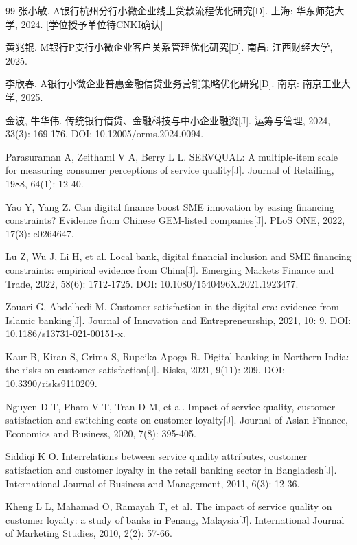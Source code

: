 \begin{thebibliography}{99}
 张小敏. A银行杭州分行小微企业线上贷款流程优化研究[D]. 上海: 华东师范大学, 2024. [学位授予单位待CNKI确认]

 黄兆锟. M银行P支行小微企业客户关系管理优化研究[D]. 南昌: 江西财经大学, 2025.

 李欣春. A银行小微企业普惠金融信贷业务营销策略优化研究[D]. 南京: 南京工业大学, 2025.

 金波, 牛华伟. 传统银行借贷、金融科技与中小企业融资[J]. 运筹与管理, 2024, 33(3): 169-176. DOI: 10.12005/orms.2024.0094.

 Parasuraman A, Zeithaml V A, Berry L L. SERVQUAL: A multiple-item scale for measuring consumer perceptions of service quality[J]. Journal of Retailing, 1988, 64(1): 12-40.

 Yao Y, Yang Z. Can digital finance boost SME innovation by easing financing constraints? Evidence from Chinese GEM-listed companies[J]. PLoS ONE, 2022, 17(3): e0264647.

 Lu Z, Wu J, Li H, et al. Local bank, digital financial inclusion and SME financing constraints: empirical evidence from China[J]. Emerging Markets Finance and Trade, 2022, 58(6): 1712-1725. DOI: 10.1080/1540496X.2021.1923477.

 Zouari G, Abdelhedi M. Customer satisfaction in the digital era: evidence from Islamic banking[J]. Journal of Innovation and Entrepreneurship, 2021, 10: 9. DOI: 10.1186/s13731-021-00151-x.

 Kaur B, Kiran S, Grima S, Rupeika-Apoga R. Digital banking in Northern India: the risks on customer satisfaction[J]. Risks, 2021, 9(11): 209. DOI: 10.3390/risks9110209.

 Nguyen D T, Pham V T, Tran D M, et al. Impact of service quality, customer satisfaction and switching costs on customer loyalty[J]. Journal of Asian Finance, Economics and Business, 2020, 7(8): 395-405.

 Siddiqi K O. Interrelations between service quality attributes, customer satisfaction and customer loyalty in the retail banking sector in Bangladesh[J]. International Journal of Business and Management, 2011, 6(3): 12-36.

 Kheng L L, Mahamad O, Ramayah T, et al. The impact of service quality on customer loyalty: a study of banks in Penang, Malaysia[J]. International Journal of Marketing Studies, 2010, 2(2): 57-66.


\end{thebibliography}
